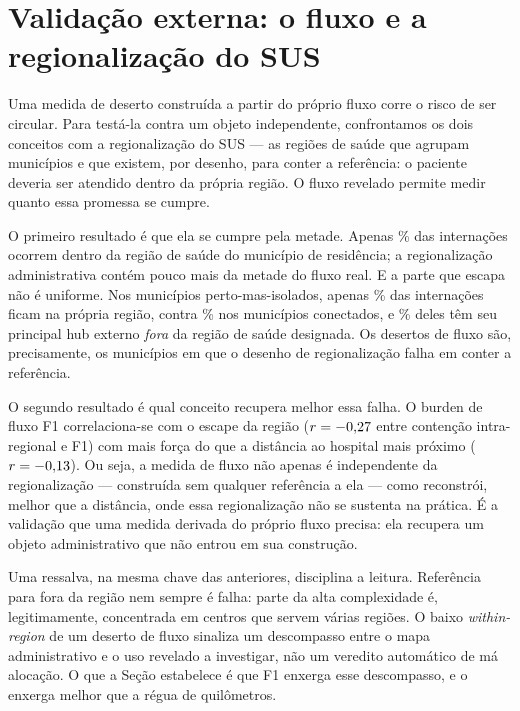 
\section{Validação externa: o fluxo e a regionalização do SUS}
\label{sec:validacao}

Uma medida de deserto construída a partir do próprio fluxo corre o risco de ser
circular. Para testá-la contra um objeto independente, confrontamos os dois
conceitos com a regionalização do SUS --- as \valNregioes{} regiões de saúde que agrupam
municípios e que existem, por desenho, para conter a referência: o paciente
deveria ser atendido dentro da própria região. O fluxo revelado permite medir
quanto essa promessa se cumpre.

O primeiro resultado é que ela se cumpre pela metade. Apenas \valWithinMean\% das
internações ocorrem dentro da região de saúde do município de residência; a
regionalização administrativa contém pouco mais da metade do fluxo real.%
E a parte que escapa não é uniforme. Nos municípios perto-mas-isolados, apenas
\valWithinFO\% das internações ficam na própria região, contra \valWithinNE\% nos
municípios conectados, e \valTophubOutFO\% deles têm seu principal hub externo
\emph{fora} da região de saúde designada.%
Os desertos de fluxo são, precisamente, os municípios em que o desenho de
regionalização falha em conter a referência.

O segundo resultado é qual conceito recupera melhor essa falha. O burden de fluxo
F1 correlaciona-se com o escape da região ($r=-0{,}27$ entre contenção
intra-regional e F1) com mais força do que a distância ao hospital mais próximo
($r=-0{,}13$).%
Ou seja, a medida de fluxo não apenas é independente da regionalização ---
construída sem qualquer referência a ela --- como reconstrói, melhor que a
distância, onde essa regionalização não se sustenta na prática. É a validação que
uma medida derivada do próprio fluxo precisa: ela recupera um objeto
administrativo que não entrou em sua construção.

Uma ressalva, na mesma chave das anteriores, disciplina a leitura. Referência
para fora da região nem sempre é falha: parte da alta complexidade é,
legitimamente, concentrada em centros que servem várias regiões. O baixo
\emph{within-region} de um deserto de fluxo sinaliza um descompasso entre o mapa
administrativo e o uso revelado a investigar, não um veredito automático de má
alocação. O que a Seção estabelece é que F1 enxerga esse descompasso, e o enxerga
melhor que a régua de quilômetros.

